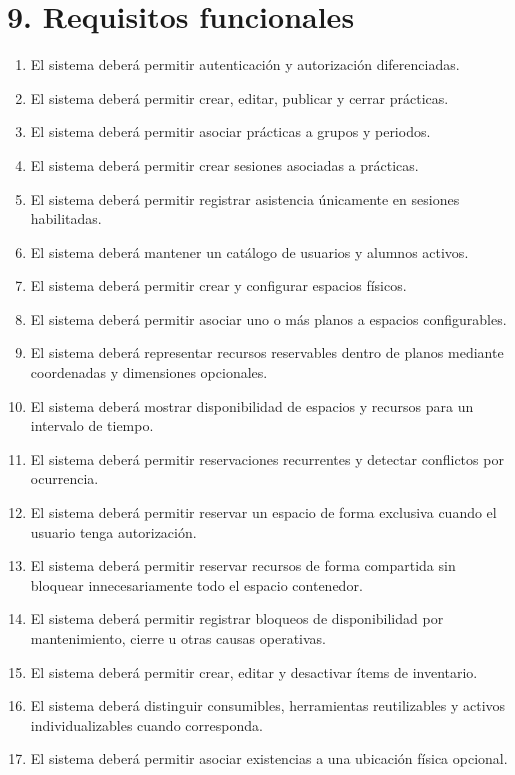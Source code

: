 \documentclass[12pt]{article}
\begin{document}
\section*{9. Requisitos funcionales}

\begin{enumerate}[label=RF\arabic*., leftmargin=1.3cm]
    \item El sistema deberá permitir autenticación y autorización diferenciadas.
    \item El sistema deberá permitir crear, editar, publicar y cerrar prácticas.
    \item El sistema deberá permitir asociar prácticas a grupos y periodos.
    \item El sistema deberá permitir crear sesiones asociadas a prácticas.
    \item El sistema deberá permitir registrar asistencia únicamente en sesiones habilitadas.
    \item El sistema deberá mantener un catálogo de usuarios y alumnos activos.
    \item El sistema deberá permitir crear y configurar espacios físicos.
    \item El sistema deberá permitir asociar uno o más planos a espacios configurables.
    \item El sistema deberá representar recursos reservables dentro de planos mediante coordenadas y dimensiones opcionales.
    \item El sistema deberá mostrar disponibilidad de espacios y recursos para un intervalo de tiempo.
    \item El sistema deberá permitir reservaciones recurrentes y detectar conflictos por ocurrencia.
    \item El sistema deberá permitir reservar un espacio de forma exclusiva cuando el usuario tenga autorización.
    \item El sistema deberá permitir reservar recursos de forma compartida sin bloquear innecesariamente todo el espacio contenedor.
    \item El sistema deberá permitir registrar bloqueos de disponibilidad por mantenimiento, cierre u otras causas operativas.
    \item El sistema deberá permitir crear, editar y desactivar ítems de inventario.
    \item El sistema deberá distinguir consumibles, herramientas reutilizables y activos individualizables cuando corresponda.
    \item El sistema deberá permitir asociar existencias a una ubicación física opcional.

\end{enumerate}
\end{document}
